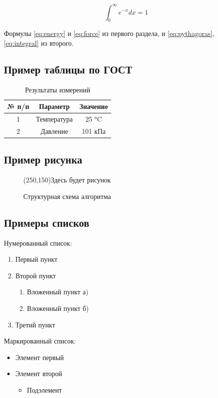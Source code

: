 \documentclass[a4paper,14pt]{extarticle}
\begin{document}
\begin{equation}
    \int_0^\infty e^{-x} dx = 1
    \label{eq:integral}
\end{equation}

Формулы \eqref{eq:energy} и \eqref{eq:force} из первого раздела, 
и \eqref{eq:pythagoras}, \eqref{eq:integral} из второго.


\subsection{Пример таблицы по ГОСТ}

\begin{table}[H]
    \caption{Результаты измерений}
    \centering
    \begin{tabular}{|c|c|c|}
        \hline
        № п/п & Параметр & Значение \\
        \hline
        1 & Температура & 25 °C \\
        2 & Давление & 101 кПа \\
        \hline
    \end{tabular}
    \label{tab:results}
\end{table}

\subsection{Пример рисунка}

\begin{figure}[H]
    \centering
    \framebox(250,150){Здесь будет рисунок}
    \caption{Структурная схема алгоритма}
    \label{fig:algorithm}
\end{figure}

\subsection{Примеры списков}

Нумерованный список:
\begin{enumerate}
    \item Первый пункт
    \item Второй пункт
    \begin{enumerate}
        \item Вложенный пункт а)
        \item Вложенный пункт б)
    \end{enumerate}
    \item Третий пункт
\end{enumerate}

Маркированный список:
\begin{itemize}
    \item Элемент первый
    \item Элемент второй
    \begin{itemize}
        \item Подэлемент
    \end{itemize}
\end{itemize}

\printbibliography[title={Список литературы}]
\end{document}
